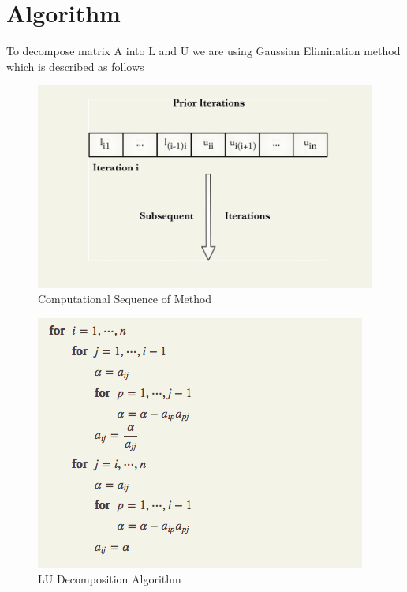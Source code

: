 \documentclass{sem5}
\begin{document}
\section{Algorithm}
To decompose matrix A into L and U we are using Gaussian Elimination method which is described as follows
\begin{figure}[!htp]
\centering
\includegraphics[scale=.5]{1.png}
\caption{Computational Sequence of Method}
\end{figure}
\begin{figure}[htp]
\centering
\includegraphics[scale=.5]{2.png}
\caption{LU Decomposition Algorithm}
\end{figure}
\end{document}
